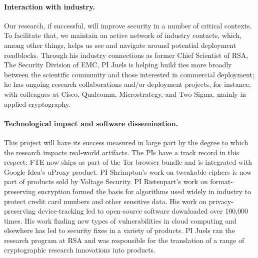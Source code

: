 \paragraph{Interaction with industry.} Our research, if successful, will improve
security in a number of critical contexts. To facilitate that, we maintain an
active network of industry contacts, which, among other things, helps us see and
navigate around potential deployment roadblocks.  Through his industry
connections as former Chief Scientist of RSA, The Security Division of EMC, PI
Juels is helping build ties more broadly between the scientific community and
those interested in commercial deployment; he has ongoing research
collaborations and/or deployment projects, for instance, with colleagues at
Cisco, Qualcomm, Microstrategy, and Two Sigma, mainly in applied cryptography.

\paragraph{Technological impact and software dissemination.}
This project will have its success measured in large part by
the degree to which the research impacts real-world artifacts.  
The PIs have a track record in this respect: FTE now ships as
part of the Tor browser bundle and is integrated with Google Idea's
uProxy product. PI Shrimpton's work on tweakable ciphers is now part of
products sold by Voltage Security. PI Ristenpart's work on format-preserving
encryption formed the basis for algorithms used widely in industry to protect
credit card numbers and other sensitive data. His work on privacy-preserving
device-tracking led to open-source software downloaded over 100,000 times. 
His work finding new types of vulnerabilities in cloud computing and elsewhere
has led to security fixes in a variety of products. PI Juels ran the research program at RSA and was responsible for the translation of a range of cryptographic research innovations into products.



